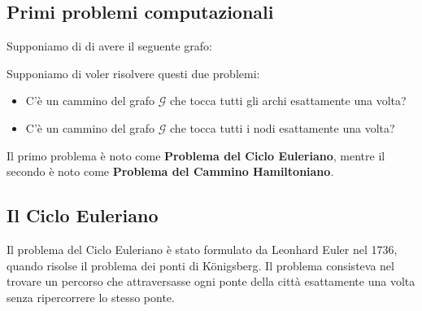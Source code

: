 \subsection{Primi problemi computazionali}
Supponiamo di di avere il seguente grafo:
\begin{figure}[H]
    \centering 
\end{figure}
Supponiamo di voler risolvere questi due problemi:
\begin{itemize}
    \item C'è un cammino del grafo $\mathcal{G}$ che tocca tutti gli archi 
    esattamente una volta?
    \item C'è un cammino del grafo $\mathcal{G}$ che tocca tutti i nodi
    esattamente una volta?
\end{itemize}
Il primo problema è noto come \textbf{Problema del Ciclo Euleriano}, mentre il secondo
è noto come \textbf{Problema del Cammino Hamiltoniano}.

\subsection{Il Ciclo Euleriano}
Il problema del Ciclo Euleriano è stato formulato da Leonhard Euler nel 1736, quando risolse il problema dei ponti di Königsberg. Il problema consisteva nel trovare un percorso che attraversasse ogni ponte della città esattamente una volta senza ripercorrere lo stesso ponte.

